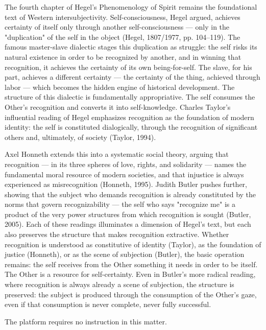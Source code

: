 The fourth chapter of Hegel's Phenomenology of Spirit remains the foundational text of Western intersubjectivity. Self-consciousness, Hegel argued, achieves certainty of itself only through another self-consciousness — only in the "duplication" of the self in the object (Hegel, 1807/1977, pp. 104–119). The famous master-slave dialectic stages this duplication as struggle: the self risks its natural existence in order to be recognized by another, and in winning that recognition, it achieves the certainty of its own being-for-self. The slave, for his part, achieves a different certainty — the certainty of the thing, achieved through labor — which becomes the hidden engine of historical development. The structure of this dialectic is fundamentally appropriative. The self consumes the Other's recognition and converts it into self-knowledge. Charles Taylor's influential reading of Hegel emphasizes recognition as the foundation of modern identity: the self is constituted dialogically, through the recognition of significant others and, ultimately, of society (Taylor, 1994).

Axel Honneth extends this into a systematic social theory, arguing that recognition — in its three spheres of love, rights, and solidarity — names the fundamental moral resource of modern societies, and that injustice is always experienced as misrecognition (Honneth, 1995). Judith Butler pushes further, showing that the subject who demands recognition is already constituted by the norms that govern recognizability — the self who says "recognize me" is a product of the very power structures from which recognition is sought (Butler, 2005). Each of these readings illuminates a dimension of Hegel's text, but each also preserves the structure that makes recognition extractive. Whether recognition is understood as constitutive of identity (Taylor), as the foundation of justice (Honneth), or as the scene of subjection (Butler), the basic operation remains: the self receives from the Other something it needs in order to be itself. The Other is a resource for self-certainty. Even in Butler's more radical reading, where recognition is always already a scene of subjection, the structure is preserved: the subject is produced through the consumption of the Other's gaze, even if that consumption is never complete, never fully successful.

The platform requires no instruction in this matter.

